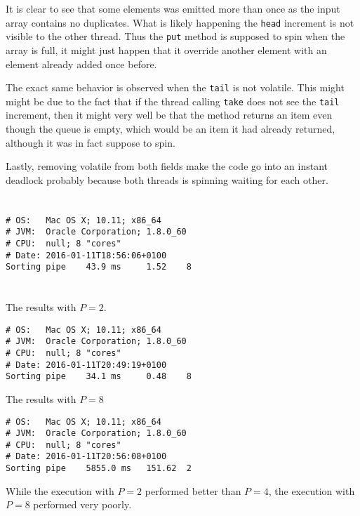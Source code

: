 \documentclass{ituhandin}
\begin{document}
It is clear to see that some elements was emitted more than once as the input array contains no duplicates. What is likely happening the  \texttt{head} increment is not visible to the other thread. Thus the \texttt{put} method is supposed to spin when the array is full, it might just happen that it override another element with an element already added once before.

The exact same behavior is observed when the \texttt{tail} is not volatile. This might might be due to the fact that if the thread calling \texttt{take} does not see the \texttt{tail} increment, then it might very well be that the method returns an item even though the queue is empty, which would be an item it had already returned, although it was in fact suppose to spin.

Lastly, removing volatile from both fields make the code go into an instant deadlock probably because both threads is spinning waiting for each other.


\section{} %
\begin{lstlisting}[language={},frame={}]
# OS:   Mac OS X; 10.11; x86_64
# JVM:  Oracle Corporation; 1.8.0_60
# CPU:  null; 8 "cores"
# Date: 2016-01-11T18:56:06+0100
Sorting pipe    43.9 ms     1.52    8
\end{lstlisting}
\section{} %


The results with $P = 2$.
\begin{lstlisting}[language={},frame={}, gobble=2]
# OS:   Mac OS X; 10.11; x86_64
# JVM:  Oracle Corporation; 1.8.0_60
# CPU:  null; 8 "cores"
# Date: 2016-01-11T20:49:19+0100
Sorting pipe    34.1 ms     0.48    8
\end{lstlisting}


The results with $P = 8$
\begin{lstlisting}[language={},frame={}]
# OS:   Mac OS X; 10.11; x86_64
# JVM:  Oracle Corporation; 1.8.0_60
# CPU:  null; 8 "cores"
# Date: 2016-01-11T20:56:08+0100
Sorting pipe    5855.0 ms   151.62  2
\end{lstlisting}

While the execution with $P = 2$ performed better than $P = 4$, the execution with $P = 8$ performed very poorly.
\end{document}
